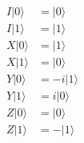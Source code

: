 \documentclass{article}
\begin{document}
\begin{align*}
I |0\rangle &= |0\rangle \\
I |1\rangle &= |1\rangle \\
X |0\rangle &= |1\rangle \\
X |1\rangle &= |0\rangle \\
Y |0\rangle &= -i |1\rangle \\
Y |1\rangle &= i |0\rangle \\
Z |0\rangle &= |0\rangle \\
Z |1\rangle &= -|1\rangle \\
\end{align*}
\end{document}
